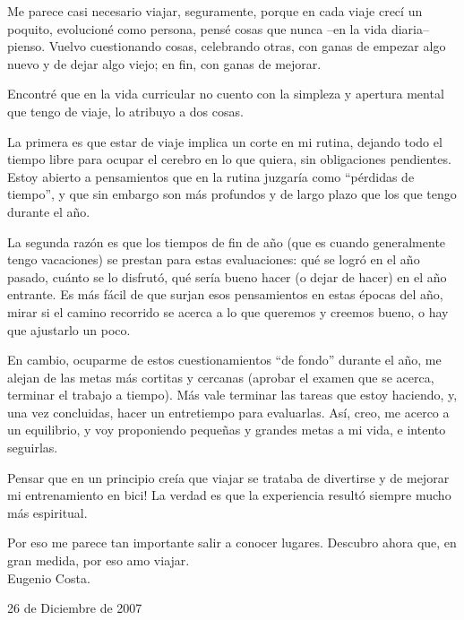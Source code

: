 
Me parece casi necesario viajar, seguramente, porque en cada viaje crec\'i un
poquito, evolucion\'e como persona, pens\'e cosas que nunca --en la vida
diaria-- pienso. Vuelvo cuestionando cosas, celebrando otras, con ganas de
empezar algo nuevo y de dejar algo viejo; en fin, con ganas de mejorar.

Encontr\'e que en la vida curricular no cuento con la simpleza y apertura
mental que tengo de viaje, lo atribuyo a dos cosas.

La primera es que estar de viaje implica un corte en mi rutina, dejando todo
el tiempo libre para ocupar el cerebro en lo que quiera, sin obligaciones
pendientes. Estoy abierto a pensamientos que en la rutina juzgar\'ia como
``p\'erdidas de tiempo'', y que sin embargo son m\'as profundos y de largo
plazo que los que tengo durante el a\~no.

La segunda raz\'on es que los tiempos de fin de a\~no (que es cuando
generalmente tengo vacaciones) se prestan para estas evaluaciones: qu\'e se
logr\'o en el a\~no pasado, cu\'anto se lo disfrut\'o, qu\'e ser\'ia bueno
hacer (o dejar de hacer) en el a\~no entrante. Es m\'as f\'acil de que surjan
esos pensamientos en estas \'epocas del a\~no, mirar si el camino recorrido se
acerca a lo que queremos y creemos bueno, o hay que ajustarlo un poco.

En cambio, ocuparme de estos cuestionamientos ``de fondo'' durante el a\~no,
me alejan de las metas m\'as cortitas y cercanas (aprobar el examen que se
acerca, terminar el trabajo a tiempo). M\'as vale terminar las tareas que
estoy haciendo, y, una vez concluidas, hacer un entretiempo para evaluarlas.
As\'i, creo, me acerco a un equilibrio, y voy proponiendo peque\~nas y grandes
metas a mi vida, e intento seguirlas.

\textexclamdown Pensar que en un principio cre\'ia que viajar se trataba de
divertirse y de mejorar mi entrenamiento en bici! La verdad es que la
experiencia result\'o siempre mucho m\'as espiritual.

Por eso me parece tan importante salir a conocer lugares. Descubro ahora que,
en gran medida, por eso amo viajar.\\

Eugenio Costa.

26 de Diciembre de 2007